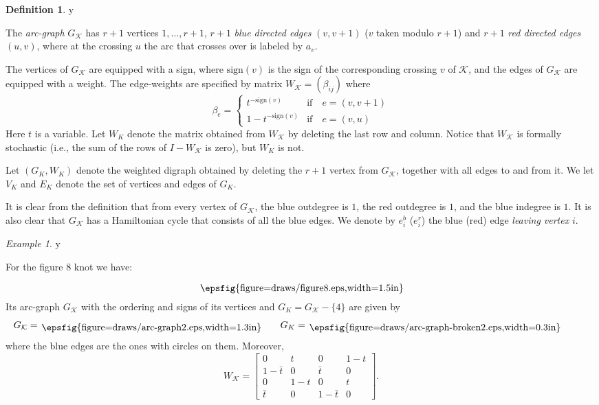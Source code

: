 \documentclass{amsart}
\theoremstyle{plain}
\theoremstyle{definition}
\newtheorem{definition}[proposition]{Definition}
\theoremstyle{remark}
\newtheorem{example}[proposition]{Example}
\def\printname#1{
        \if\draft y
                \smash{\makebox[0pt]{\hspace{-0.5in}
                        \raisebox{8pt}{\tt\tiny #1}}}
        \fi
}
\newcommand{\psdraw}[2]
         {\begin{array}{c} \hspace{-1.3mm}
        \raisebox{-4pt}{\epsfig{figure=draws/#1.eps,width=#2}}
        \hspace{-1.9mm}\end{array}}
\def\lbl#1{\label{#1}\printname{#1}}
\def\K{\mathcal K}
\def\b{\beta}
\def\bt{\bar{t}}
\def\sign{\mathrm{sign}}
\begin{document}
\begin{definition}
\lbl{def.arcgraph}
The {\em arc-graph} $G_{\K}$ has $r+1$ vertices $1,\dots, r+1$, $r+1$ {\em blue
directed edges} $(v,v+1)$ ($v$ taken modulo $r+1$) and $r+1$ {\em red 
directed edges} $(u,v)$, where at the crossing $u$ the arc that crosses over 
is labeled by $a_v$.

The vertices of $G_{\K}$ are equipped with a sign, where $\sign(v)$ is the
sign of the corresponding crossing $v$ of $\K$, and the edges of $G_{\K}$ are
equipped with a weight. The edge-weights are specified by matrix 
$W_{\K}= (\b_{ij})$
where 
$$
\b_{e}=
\begin{cases}
t^{-\sign(v)} & \text{if} \quad e=(v,v+1) \\
1-t^{-\sign(v)} & \text{if} \quad e=(v,u)
\end{cases}
$$
Here $t$ is a variable. Let $W_K$ denote the matrix obtained from $W_{\K}$
by deleting the last row and column.
Notice that $W_{\K}$ is formally stochastic
(i.e., the sum of the rows of $I-W_{\K}$ is zero), but $W_K$ is not.

Let $(G_K,W_K)$ denote the weighted digraph obtained by deleting the $r+1$ 
vertex
from $G_{\K}$, together with all edges to and from it. We let $V_K$ and $E_K$
denote the set of vertices and edges of $G_K$.
\end{definition}

It is clear from the definition that from every vertex of $G_{\K}$, the blue
outdegree is $1$, the red outdegree is $1$, and the blue indegree is $1$.
It is also clear that $G_{\K}$ has a Hamiltonian cycle that consists of all
the blue edges. We denote by $e_i^b$ ($e_i^r$) the blue (red) edge {\em leaving
vertex} $i$.

\begin{example}
\lbl{ex.1}
For the figure 8 knot we have:
$$
\psdraw{figure8}{1.5in}
$$
Its arc-graph $G_{\K}$ with the ordering and signs
of its vertices and  $G_K=G_{\K}-\{4\}$ are given by 
$$
\hspace{-1cm}
G_{\K}=
\psdraw{arc-graph2}{1.3in} \qquad G_K=
\psdraw{arc-graph-broken2}{0.3in}
$$  
where the blue edges are the ones with circles on them. Moreover, 
$$
W_{\K}=
\left[
\begin{matrix}
 0 & t & 0   & 1-t \\
 1-\bt & 0     & \bt & 0   \\
 0 & 1-t   & 0   & t \\
 \bt & 0   & 1-\bt   & 0   
\end{matrix}
\right] .
$$

\end{example}
\end{document}
